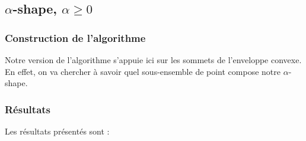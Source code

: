 \subsection{$\alpha$-shape, $\alpha \geq 0$}

\subsubsection{Construction de l'algorithme}


Notre version de l'algorithme s'appuie ici sur les sommets de l'enveloppe convexe. En effet, on va chercher à savoir quel sous-ensemble de point compose notre $\alpha$-shape.

\subsubsection{Résultats}

Les résultats présentés sont : 




